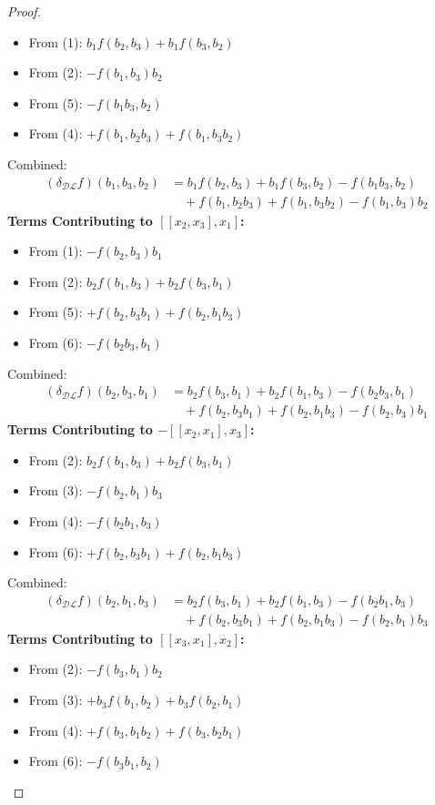 \documentclass[a4paper, 12pt,oneside,reqno]{amsart}
\newcommand{\DL}{\mathcal{DL}}
\begin{document}
\begin{proof}
\begin{itemize}
\item From (1): $b_1f(b_2,b_3)+b_1f(b_3,b_2)$
\item From (2): $-f(b_1, b_3)b_2$
\item From (5): $-f(b_1b_3, b_2)$
\item From (4): $+f(b_1,b_2b_3)+f(b_1,b_3b_2)$
\end{itemize}
Combined:
\begin{align*}
(\delta_{\DL} f)(b_1, b_3, b_2) &= b_1f(b_2,b_3)+b_1 f(b_3,b_2) - f(b_1  b_3, b_2) \\
&\quad + f(b_1, b_2  b_3) + f(b_1, b_3  b_2) - f(b_1,b_3)  b_2
\end{align*}
\textbf{Terms Contributing to $[[x_2,x_3],x_1]$:}
\begin{itemize}
\item From (1): $-f(b_2,  b_3)b_1$ 
\item From (2):  $  b_2f(b_1,b_3)+b_2f(b_3,b_1)$
\item From (5): $+f(b_2, b_3  b_1)+f(b_2,b_1b_3)$
\item From (6): $-f(b_2b_3,b_1)$
\end{itemize}
Combined:
\begin{align*}
(\delta_{\DL} f)(b_2, b_3, b_1) &= b_2f(b_3,b_1)+b_2 f(b_1,b_3) - f(b_2  b_3, b_1) \\
&\quad + f(b_2, b_3  b_1) + f(b_2, b_1  b_3) - f(b_2,b_3)  b_1
\end{align*}
\textbf{Terms Contributing to $-[[x_2,x_1],x_3]$:}
\begin{itemize}
\item From (2): $b_2f(b_1,  b_3)+b_2f(b_3,b_1)$ 
\item From (3):  $ - f(b_2,b_1)b_3$
\item From (4): $-f(b_2b_1, b_3 )$
\item From (6): $+f(b_2,b_3b_1)+f(b_2,b_1b_3)$
\end{itemize}
Combined:
\begin{align*}
(\delta_{\DL} f)(b_2, b_1, b_3) &= b_2f(b_3,b_1)+b_2 f(b_1,b_3) - f(b_2  b_1, b_3) \\
&\quad + f(b_2, b_3  b_1) + f(b_2, b_1  b_3) - f(b_2,b_1)  b_3
\end{align*}
\textbf{Terms Contributing to $[[x_3,x_1],x_2]$:}

\begin{itemize}
\item From (2): $-f(b_3,b_1)b_2$
\item From (3): $+b_3f(b_1, b_2)+b_3f(b_2,b_1)$
\item From (4): $+f(b_3,b_1b_2)+f(b_3,b_2b_1)$ 
\item From (6): $-f(b_3b_1,b_2)$
\end{itemize}


\end{proof}
\end{document}
